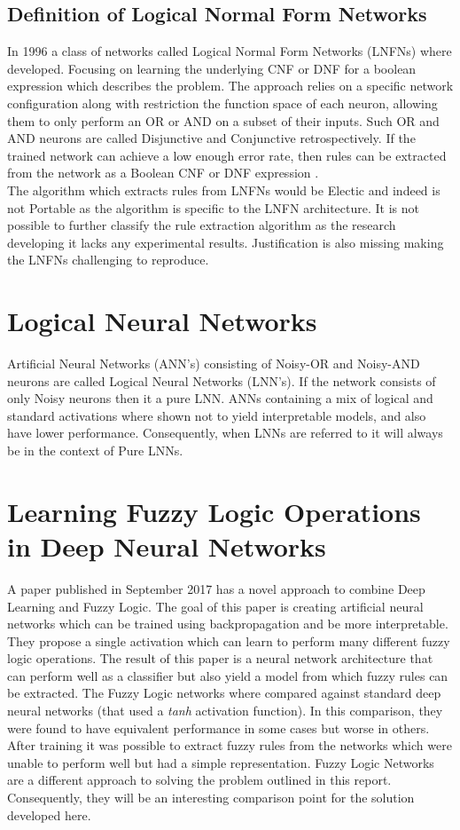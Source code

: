 \subsection{Definition of Logical Normal Form Networks}
In 1996 a class of networks called Logical Normal Form Networks \cite{herrmann1996backpropagation} (LNFNs) where developed. Focusing on learning the underlying CNF or DNF for a boolean expression which describes the problem. The approach relies on a specific network configuration along with restriction the function space of each neuron, allowing them to only perform an OR or AND on a subset of their inputs. Such OR and AND neurons are called Disjunctive and Conjunctive retrospectively. If the trained network can achieve a low enough error rate, then rules can be extracted from the network as a Boolean CNF or DNF expression \cite{herrmann1996backpropagation}.\\

The algorithm which extracts rules from LNFNs would be Electic and indeed is not Portable as the algorithm is specific to the LNFN architecture. It is not possible to further classify the rule extraction algorithm as the research developing it lacks any experimental results. Justification is also missing making the LNFNs challenging to reproduce.

\section{Logical Neural Networks}
Artificial Neural Networks (ANN's) consisting of Noisy-OR and Noisy-AND neurons are called Logical Neural Networks \cite{LearningLogicalActivations} (LNN's). If the network consists of only Noisy neurons then it a pure LNN. ANNs containing a mix of logical and standard activations where shown not to yield interpretable models, and also have lower performance. Consequently, when LNNs are referred to it will always be in the context of Pure LNNs.


\section{Learning Fuzzy Logic Operations in Deep Neural Networks}
A paper published in September 2017 \cite{godfrey2017parameterized} has a novel approach to combine Deep Learning and Fuzzy Logic. The goal of this paper is creating artificial neural networks which can be trained using backpropagation and be more interpretable. They propose a single activation which can learn to perform many different fuzzy logic operations. The result of this paper is a neural network architecture that can perform well as a classifier but also yield a model from which fuzzy rules can be extracted. The Fuzzy Logic networks where compared against standard deep neural networks (that used a \textit{tanh} activation function). In this comparison, they were found to have equivalent performance in some cases but worse in others. After training it was possible to extract fuzzy rules from the networks which were unable to perform well but had a simple representation. Fuzzy Logic Networks are a different approach to solving the problem outlined in this report. Consequently, they will be an interesting comparison point for the solution developed here.

